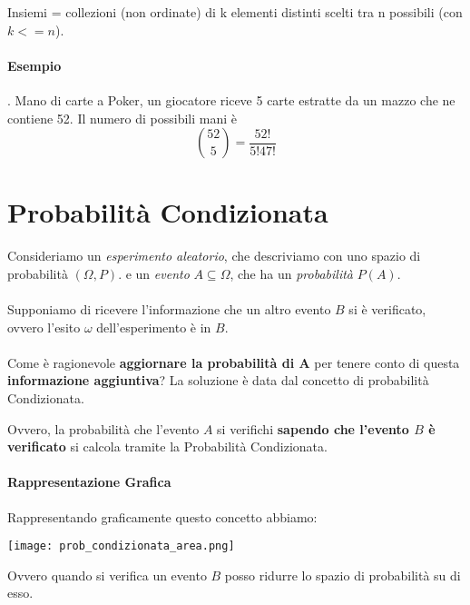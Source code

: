 
Insiemi = collezioni (non ordinate) di k elementi distinti scelti tra n possibili (con $k <= n$).
\paragraph{Esempio}. Mano di carte a Poker, un giocatore riceve 5 carte estratte da un mazzo che
ne contiene 52. Il numero di possibili mani è
\begin{equation}
    {52 \choose 5} = \frac{52!}{5!47!}
\end{equation} 

\pagebreak
\section{Probabilità Condizionata}
Consideriamo un \emph{esperimento aleatorio}, che descriviamo con uno spazio di probabilità $(\Omega, P)$.
e un \emph{evento} $A \subseteq \Omega$, che ha un \emph{probabilità} $P(A)$.
\\\\Supponiamo di ricevere l'informazione che un altro evento $B$ si è verificato, ovvero l'esito $\omega$ dell'esperimento è in $B$.
\\\\Come è ragionevole \textbf{aggiornare la probabilità di A} per tenere conto di questa \textbf{informazione aggiuntiva}?
La soluzione è data dal concetto di probabilità Condizionata.

Ovvero, la probabilità che l'evento $A$ si verifichi \textbf{sapendo che l'evento $B$ è verificato} si calcola tramite la Probabilità Condizionata.
\paragraph*{Rappresentazione Grafica} Rappresentando graficamente questo concetto abbiamo:
\begin{center}
    \texttt{[image: prob\_condizionata\_area.png]}    
\end{center}
Ovvero quando si verifica un evento $B$ posso ridurre lo spazio di probabilità su di esso.

